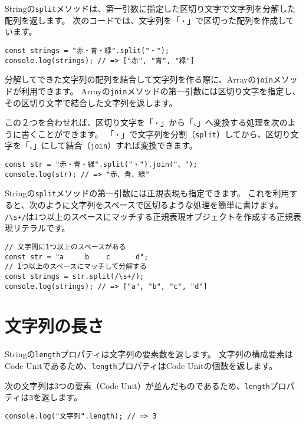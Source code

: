 Stringの\texttt{split}メソッドは、第一引数に指定した区切り文字で文字列を分解した配列を返します。
次のコードでは、文字列を「\texttt{・}」で区切った配列を作成しています。

\begin{lstlisting}
const strings = "赤・青・緑".split("・");
console.log(strings); // => ["赤", "青", "緑"]
\end{lstlisting}

分解してできた文字列の配列を結合して文字列を作る際に、Arrayの\texttt{join}メソッドが利用できます。
Arrayの\texttt{join}メソッドの第一引数には区切り文字を指定し、その区切り文字で結合した文字列を返します。

この２つを合わせれば、区切り文字を「\texttt{・}」から「\texttt{、}」へ変換する処理を次のように書くことができます。
「\texttt{・}」で文字列を分割（\texttt{split}）してから、区切り文字を「\texttt{、}」にして結合（\texttt{join}）すれば変換できます。

\begin{lstlisting}
const str = "赤・青・緑".split("・").join("、");
console.log(str); // => "赤、青、緑"
\end{lstlisting}

Stringの\texttt{split}メソッドの第一引数には正規表現も指定できます。
これを利用すると、次のように文字列をスペースで区切るような処理を簡単に書けます。
\texttt{/\textbackslash s+/}は1つ以上のスペースにマッチする正規表現オブジェクトを作成する正規表現リテラルです。

\begin{lstlisting}
// 文字間に1つ以上のスペースがある
const str = "a     b    c      d";
// 1つ以上のスペースにマッチして分解する
const strings = str.split(/\s+/);
console.log(strings); // => ["a", "b", "c", "d"]
\end{lstlisting}

\hypertarget{length}{%
\section{文字列の長さ}\label{length}}

Stringの\texttt{length}プロパティは文字列の要素数を返します。
文字列の構成要素はCode
Unitであるため、\texttt{length}プロパティはCode
Unitの個数を返します。

次の文字列は3つの要素（Code
Unit）が並んだものであるため、\texttt{length}プロパティは\texttt{3}を返します。

\begin{lstlisting}
console.log("文字列".length); // => 3
\end{lstlisting}

